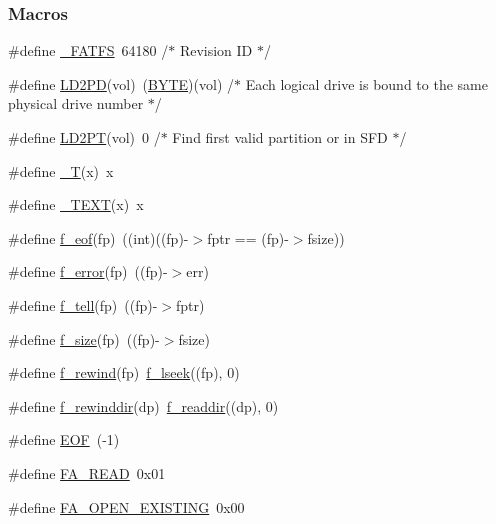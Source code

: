 \subsubsection*{Macros}
\begin{DoxyCompactItemize}
\item 
\#define \hyperlink{ff_8h_a749228947bc890224b8bd5de6e11faa3}{\+\_\+\+F\+A\+T\+F\+S}~64180	/$\ast$ Revision I\+D $\ast$/
\item 
\#define \hyperlink{ff_8h_a6577ed2f95527745bf4d27c53488b9a7}{L\+D2\+P\+D}(vol)~(\hyperlink{integer_8h_a4ae1dab0fb4b072a66584546209e7d58}{B\+Y\+T\+E})(vol)	/$\ast$ Each logical drive is bound to the same physical drive number $\ast$/
\item 
\#define \hyperlink{ff_8h_aadc4a9aefaf2588bdd7565549f5d91e7}{L\+D2\+P\+T}(vol)~0			/$\ast$ Find first valid partition or in S\+F\+D $\ast$/
\item 
\#define \hyperlink{ff_8h_ae936e4c15227768f7da4e0951def89c8}{\+\_\+\+T}(x)~x
\item 
\#define \hyperlink{ff_8h_a3232964568d17bb4a1af30f9db826ce2}{\+\_\+\+T\+E\+X\+T}(x)~x
\item 
\#define \hyperlink{ff_8h_a970cdd8970a3a94967ad64cfc5d4c161}{f\+\_\+eof}(fp)~((int)((fp)-\/$>$fptr == (fp)-\/$>$fsize))
\item 
\#define \hyperlink{ff_8h_a25cbdabeed318802cf0e9db6671a33b7}{f\+\_\+error}(fp)~((fp)-\/$>$err)
\item 
\#define \hyperlink{ff_8h_a5e1daca7ce13cdc277e42185f7f9124f}{f\+\_\+tell}(fp)~((fp)-\/$>$fptr)
\item 
\#define \hyperlink{ff_8h_a26f33722c5bf1aa3cd6f0290a83eb2bc}{f\+\_\+size}(fp)~((fp)-\/$>$fsize)
\item 
\#define \hyperlink{ff_8h_ae4caf47dd5cbc123b61d35542481b1be}{f\+\_\+rewind}(fp)~\hyperlink{ff_8h_a5df0ac672ada972e89ef4b003e57f964}{f\+\_\+lseek}((fp), 0)
\item 
\#define \hyperlink{ff_8h_a3f92b6c0c1648de678283ab6f1610161}{f\+\_\+rewinddir}(dp)~\hyperlink{ff_8h_ab39e82a110695de45f416f3149358012}{f\+\_\+readdir}((dp), 0)
\item 
\#define \hyperlink{ff_8h_a59adc4c82490d23754cd39c2fb99b0da}{E\+O\+F}~(-\/1)
\item 
\#define \hyperlink{ff_8h_a1f4f3530ff03abbd979b072536e72290}{F\+A\+\_\+\+R\+E\+A\+D}~0x01
\item 
\#define \hyperlink{ff_8h_a0c5dd686b10f84c2a2b3954957a5979a}{F\+A\+\_\+\+O\+P\+E\+N\+\_\+\+E\+X\+I\+S\+T\+I\+N\+G}~0x00
\item 

\end{DoxyCompactItemize}

